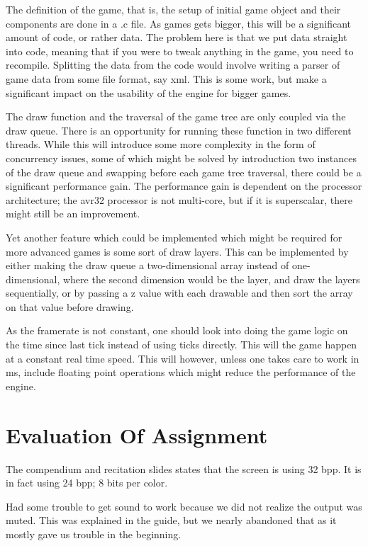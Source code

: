 \documentclass[a4paper,12pt]{article}
\begin{document}
The definition of the game, that is, the setup of initial game object and their components are done in a .c file. As games gets bigger, this will be a significant amount of code, or rather data. The problem here is that we put data straight into code, meaning that if you were to tweak anything in the game, you need to recompile. Splitting the data from the code would involve writing a parser of game data from some file format, say xml. This is some work, but make a significant impact on the usability of the engine for bigger games.

The draw function and the traversal of the game tree are only coupled via the draw queue. There is an opportunity for running these function in two different threads. While this will introduce some more complexity in the form of concurrency issues, some of which might be solved by introduction two instances of the draw queue and swapping before each game tree traversal, there could be a significant performance gain. The performance gain is dependent on the processor architecture; the avr32 processor is not multi-core, but if it is superscalar, there might still be an improvement.

Yet another feature which could be implemented which might be required for more advanced games is some sort of draw layers. This can be implemented by either making the draw queue a two-dimensional array instead of one-dimensional, where the second dimension would be the layer, and draw the layers sequentially, or by passing a z value with each drawable and then sort the array on that value before drawing.

As the framerate is not constant, one should look into doing the game logic on the time since last tick instead of using ticks directly. This will the game happen at a constant real time speed. This will however, unless one takes care to work in ms, include floating point operations which might reduce the performance of the engine.

\clearpage
\section{Evaluation Of Assignment}

The compendium and recitation slides states that the screen is using 32 bpp. It is in fact using 24 bpp; 8 bits per color.

Had some trouble to get sound to work because we did not realize the output was muted. This was explained in the guide, but we nearly abandoned that as it mostly gave us trouble in the beginning.
\end{document}
